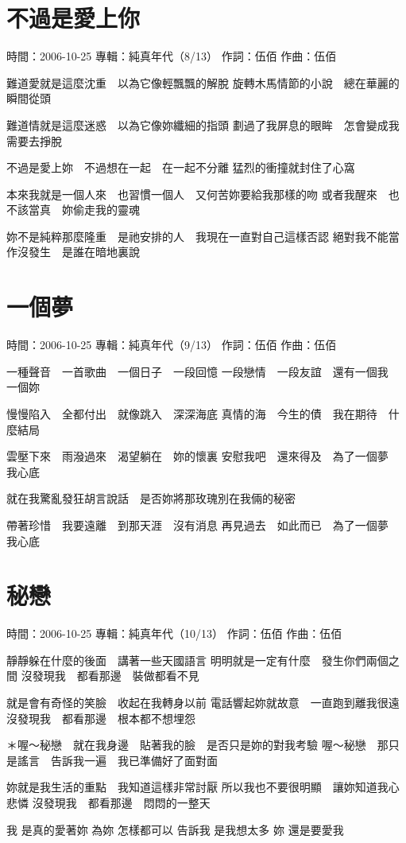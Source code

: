 \documentclass[UTF8,a4paper,oneside,twocolumn,12pt]{ctexbook}
\newcommand{\infopair}[2]{\textbullet #1：#2}
\newcommand{\zc}[1][伍佰]{\infopair{作詞}{#1}}
\newcommand{\zq}[1][伍佰]{\infopair{作曲}{#1}}
\newcommand{\zj}[1]{\infopair{專輯}{#1}}
\newcommand{\sj}[1]{\infopair{時間}{#1}}
\newenvironment{info}{\begin{flushleft}\kaishu
	}
	{\end{flushleft}\normalsize\yahei\par}
\newenvironment{lyric}{
	}
{}
\begin{document}
\section{不過是愛上你}
\begin{info}
	\sj{2006-10-25}
	\zj{純真年代（8/13）}
	\zc
	\zq
\end{info}
\begin{lyric}
	難道愛就是這麼沈重　以為它像輕飄飄的解脫
	旋轉木馬情節的小說　總在華麗的瞬間從頭

	難道情就是這麼迷惑　以為它像妳纖細的指頭
	劃過了我屏息的眼眸　怎會變成我需要去掙脫

	不過是愛上妳　不過想在一起　在一起不分離
	猛烈的衝撞就封住了心窩

	本來我就是一個人來　也習慣一個人　又何苦妳要給我那樣的吻
	或者我醒來　也不該當真　妳偷走我的靈魂

	妳不是純粹那麼隆重　是祂安排的人　我現在一直對自己這樣否認
	絕對我不能當作沒發生　是誰在暗地裏說
\end{lyric}

\section{一個夢}
\begin{info}
	\sj{2006-10-25}
	\zj{純真年代（9/13）}
	\zc
	\zq
\end{info}
\begin{lyric}
	一種聲音　一首歌曲　一個日子　一段回憶
	一段戀情　一段友誼　還有一個我　一個妳

	慢慢陷入　全都付出　就像跳入　深深海底
	真情的海　今生的債　我在期待　什麼結局

	雲壓下來　雨潑過來　渴望躺在　妳的懷裏
	安慰我吧　還來得及　為了一個夢　我心底

	就在我驚亂發狂胡言說話　是否妳將那玫瑰別在我倆的秘密

	帶著珍惜　我要遠離　到那天涯　沒有消息
	再見過去　如此而已　為了一個夢　我心底
\end{lyric}

\section{秘戀}
\begin{info}
	\sj{2006-10-25}
	\zj{純真年代（10/13）}
	\zc
	\zq
\end{info}
\begin{lyric}
	靜靜躲在什麼的後面　講著一些天國語言
	明明就是一定有什麼　發生你們兩個之間
	沒發現我　都看那邊　裝做都看不見

	就是會有奇怪的笑臉　收起在我轉身以前
	電話響起妳就故意　一直跑到離我很遠
	沒發現我　都看那邊　根本都不想埋怨

	＊喔～秘戀　就在我身邊　貼著我的臉　是否只是妳的對我考驗
	喔～秘戀　那只是謠言　告訴我一遍　我已準備好了面對面

	妳就是我生活的重點　我知道這樣非常討厭
	所以我也不要很明顯　讓妳知道我心悲憐
	沒發現我　都看那邊　悶悶的一整天

	我 是真的愛著妳
	為妳 怎樣都可以
	告訴我 是我想太多
	妳 還是要愛我
\end{lyric}
\end{document}
